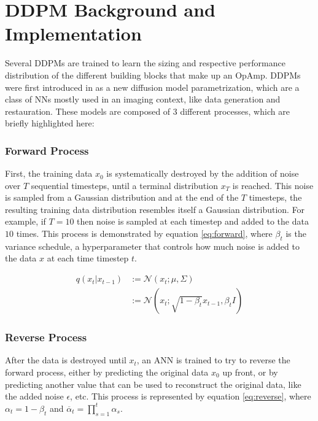 \documentclass[conference]{IEEEtran}
\begin{document}
\section{DDPM Background and Implementation}\label{sec:ddpm}
	Several DDPMs are trained to learn the sizing and respective performance distribution of the different building blocks that make up an OpAmp. DDPMs were first introduced in \cite{ho2020denoisingdiffusionprobabilisticmodels} as a new diffusion model parametrization, which are a class of NNs mostly used in an imaging context, like data generation and restauration. These models are composed of 3 different processes, which are briefly highlighted here:
	
	\subsubsection{Forward Process}
	First, the training data $x_{0}$ is systematically destroyed by the addition of noise over $T$ sequential timesteps, until a terminal distribution $x_{T}$ is reached. This noise is sampled from a Gaussian distribution and at the end of the $T$ timesteps, the resulting training data distribution resembles itself a Gaussian distribution. For example, if $T=10$ then noise is sampled at each timestep and added to the data $10$ times. This process is demonstrated by equation \ref{eq:forward}, where $\beta_{t}$ is the variance schedule, a hyperparameter that controls how much noise is added to the data $x$ at each time timestep $t$.
	
	\begin{equation} \label{eq:forward}
	\begin{aligned}
	q(x_{t}|x_{t-1}) &:= \mathcal{N}(x_{t};\mu,\Sigma) \\ &:= \mathcal{N}(x_{t};\sqrt{1-\beta_{t}}x_{t-1}, \beta_{t}I)
	\end{aligned}
	\end{equation}
	
	\subsubsection{Reverse Process}
	After the data is destroyed until $x_{t}$, an ANN is trained to try to reverse the forward process, either by predicting the original data $x_{0}$ up front, or by predicting another value that can be used to reconstruct the original data, like the added noise $\epsilon$, etc. This process is represented by equation \ref{eq:reverse}, where $\alpha_{t}=1-\beta_{t}$ and $\overline{\alpha}_{t}=\prod_{s=1}^{t}\alpha_{s}$.
	
\end{document}
